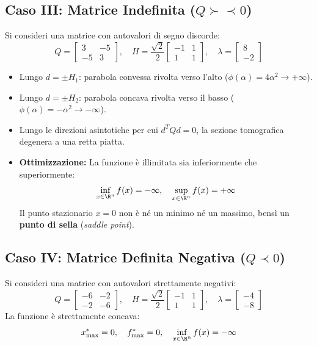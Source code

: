 \subsection{Caso III: Matrice Indefinita (\texorpdfstring{$Q \succ\prec 0$}{Q ind})}
Si consideri una matrice con autovalori di segno discorde:
\begin{equation}
Q = \begin{bmatrix} 3 & -5 \\ -5 & 3 \end{bmatrix}, \quad H = \frac{\sqrt{2}}{2} \begin{bmatrix} -1 & 1 \\ 1 & 1 \end{bmatrix}, \quad \lambda = \begin{bmatrix} 8 \\ -2 \end{bmatrix}
\end{equation}
\begin{itemize}
    \item Lungo $d = \pm H_1$: parabola convessa rivolta verso l'alto ($\phi(\alpha) = 4\alpha^2 \to +\infty$).
    \item Lungo $d = \pm H_2$: parabola concava rivolta verso il basso ($\phi(\alpha) = -\alpha^2 \to -\infty$).
    \item Lungo le direzioni asintotiche per cui $d^T Q d = 0$, la sezione tomografica degenera a una retta piatta.
    \item \textbf{Ottimizzazione:} La funzione \`e illimitata sia inferiormente che superiormente:
    \begin{equation}
    \inf_{x \in \R^n} f(x) = -\infty, \quad \sup_{x \in \R^n} f(x) = +\infty
    \end{equation}
    Il punto stazionario $x = 0$ non \`e n\'e un minimo n\'e un massimo, bens\`i un \textbf{punto di sella} (\textit{saddle point}).
\end{itemize}

\subsection{Caso IV: Matrice Definita Negativa (\texorpdfstring{$Q \prec 0$}{Q < 0})}
Si consideri una matrice con autovalori strettamente negativi:
\begin{equation}
Q = \begin{bmatrix} -6 & -2 \\ -2 & -6 \end{bmatrix}, \quad H = \frac{\sqrt{2}}{2} \begin{bmatrix} -1 & 1 \\ 1 & 1 \end{bmatrix}, \quad \lambda = \begin{bmatrix} -4 \\ -8 \end{bmatrix}
\end{equation}
La funzione \`e strettamente concava:
\begin{equation}
x^*_{\max} = 0, \quad f^*_{\max} = 0, \quad \inf_{x \in \R^n} f(x) = -\infty
\end{equation}


